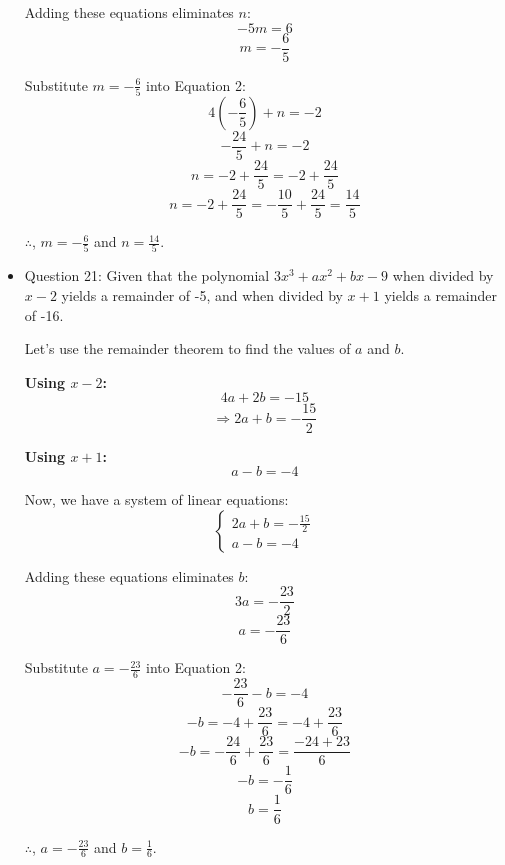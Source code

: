 \documentclass{article}
\begin{document}
\begin{itemize}
    Adding these equations eliminates $n$:
    \[ -5m = 6 \]
    \[ m = -\frac{6}{5} \]
    
    Substitute $m = -\frac{6}{5}$ into Equation 2:
    \[ 4\left(-\frac{6}{5}\right) + n = -2 \]
    \[ -\frac{24}{5} + n = -2 \]
    \[ n = -2 + \frac{24}{5} = -2 + \frac{24}{5} \]
    \[ n = -2 + \frac{24}{5} = -\frac{10}{5} + \frac{24}{5} = \frac{14}{5} \]
    
    $\therefore$, $m = -\frac{6}{5}$ and $n = \frac{14}{5}$.
    \newpage 
    \item Question 21:
    Given that the polynomial $3x^3 + ax^2 + bx - 9$ when divided by $x - 2$ yields a remainder of -5, and when divided by $x + 1$ yields a remainder of -16.
    
    Let's use the remainder theorem to find the values of $a$ and $b$.
    
    \textbf{Using $x - 2$:}
    \[ 4a + 2b = -15 \]
    \[ \Rightarrow 2a + b = -\frac{15}{2} \]
    
    \textbf{Using $x + 1$:}
    \[ a - b = -4 \]
    
    Now, we have a system of linear equations:
    \[ 
    \begin{cases}
    2a + b = -\frac{15}{2} \\
    a - b = -4
    \end{cases}
    \]
    
    Adding these equations eliminates $b$:
    \[ 3a = -\frac{23}{2} \]
    \[ a = -\frac{23}{6} \]
    
    Substitute $a = -\frac{23}{6}$ into Equation 2:
    \[ -\frac{23}{6} - b = -4 \]
    \[ - b = -4 + \frac{23}{6} = -4 + \frac{23}{6} \]
    \[ - b = -\frac{24}{6} + \frac{23}{6} = \frac{-24 + 23}{6} \]
    \[ - b = -\frac{1}{6} \]
    \[ b = \frac{1}{6} \]
    
    $\therefore$, $a = -\frac{23}{6}$ and $b = \frac{1}{6}$.

\end{itemize}
\end{document}
